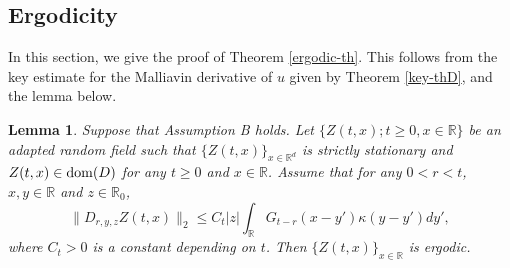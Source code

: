 \documentclass[12pt]{article}
\newtheorem{lemma}[theorem]{Lemma}
\def\bR{\mathbb{R}}
\def\k{\kappa}
\begin{document}
\subsection{Ergodicity}

In this section, we give the proof of Theorem \ref{ergodic-th}. This
follows from the key estimate for the Malliavin derivative of $u$ given by Theorem \ref{key-thD}, and the lemma below.

\begin{lemma}
\label{lem-key-Z}
Suppose that Assumption B holds.
Let $\{Z(t,x);t\geq 0,x\in \bR\}$ be an adapted random field such that
$\{Z(t,x)\}_{x\in \bR^d}$ is strictly stationary and $Z(t,x) \in {\rm dom}(D)$ for any $t\geq 0$ and $x \in \bR$. Assume that for any $0<r<t$, $x,y \in \bR$ and $z \in \bR_0$,
\begin{equation}
\label{key-Z}
\|D_{r,y,z}Z(t,x)\|_{2} \leq C_t |z| \int_{\bR} G_{t-r}(x-y')\k(y-y')dy',
\end{equation}
where $C_t>0$ is a constant depending on $t$. Then $\{Z(t,x)\}_{x\in \bR}$ is ergodic.
\end{lemma}
\end{document}
